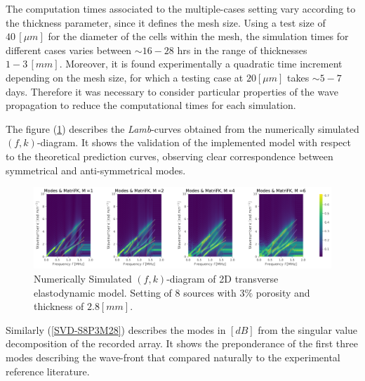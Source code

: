 \begin{rem}
The computation times associated to the multiple-cases setting vary according to the thickness parameter, since it defines the mesh size. Using a test size of $40 \, [\mu m]$ for the diameter of the cells within the mesh, the simulation times for different cases varies between $\sim 16-28$ hrs in the range of thicknesses $1-3 \, [mm]$. Moreover, it is found experimentally a quadratic time increment depending on the mesh size, for which a testing case at $20 [\mu m]$ takes $\sim 5-7$ days. 
Therefore it was necessary to consider particular properties of the wave propagation to reduce the computational times for each simulation.
\end{rem}

The figure (\ref{FK-DiagramS8P3M28}) describes the \textit{Lamb}-curves obtained from the numerically simulated $(f,k)$-diagram. It shows the validation of the implemented model with respect to the theoretical prediction curves, observing clear correspondence between symmetrical and anti-symmetrical modes.


\begin{figure}[!h]
	\centering
	\includegraphics[width=\textwidth]{images/TimeMultSous/2DTimeS8P3ElasticFK28M780_y.pdf}
	\caption{Numerically Simulated $(f,k)$-diagram of 2D transverse elastodynamic model. Setting of 8 sources with $3\%$ porosity and thickness of $2.8 [mm]$.}
	\label{FK-DiagramS8P3M28}
\end{figure}


Similarly (\ref{SVD-S8P3M28}) describes the modes in $[dB]$ from the singular value decomposition of the recorded array. It shows the preponderance of the first three modes describing the wave-front that compared naturally to the experimental reference literature.


